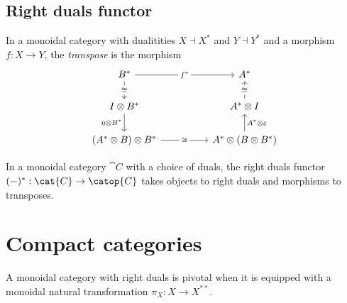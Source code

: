 \documentclass{article}
\begin{document}
\subsection{Right duals functor}

\begin{definition}
  In a monoidal category with dualitities $X\dashv X^*$ and $Y\dashv Y^*$ and a morphism
  $f:X\to Y$, the \emph{transpose} is the morphism
  \begin{equation}
    \begin{tikzcd}
      {B^*} && {A^*} \\
      {I\otimes B^*} && {A^*\otimes I} \\
      {(A^*\otimes B)\otimes B^*} && {A^*\otimes (B\otimes B^*)}
      \arrow["{f^*}"{description}, from=1-1, to=1-3]
      \arrow["\cong"{description}, from=2-3, to=1-3]
      \arrow["\cong"{description}, from=3-1, to=3-3]
      \arrow["\cong"{description}, from=1-1, to=2-1]
      \arrow["{\eta\otimes B^*}"', from=2-1, to=3-1]
      \arrow["{A^*\otimes\varepsilon}"', from=3-3, to=2-3]
    \end{tikzcd}
  \end{equation}
\end{definition}

\begin{definition}
  In a monoidal category $\cat{C}$ with a choice of duals, the right duals functor
  $(-)^* : \cat{C}\to\catop{C}$ takes objects to right duals and morphisms to transposes.
\end{definition}

\section{Compact categories}

\begin{definition}
  A monoidal category with right duals is pivotal when it is equipped with a monoidal
  natural transformation $\pi_X : X\to X^{**}$.
\end{definition}
\end{document}
